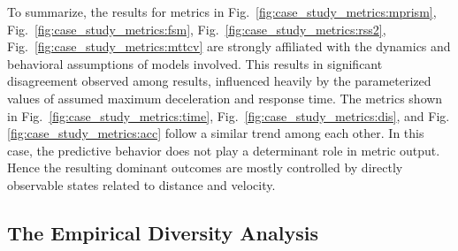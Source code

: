 \documentclass[journal]{IEEEtran}
\begin{document}
To summarize, the results for metrics in Fig.~\ref{fig:case_study_metrics:mprism}, Fig.~\ref{fig:case_study_metrics:fsm}, Fig.~\ref{fig:case_study_metrics:rss2}, Fig.~\ref{fig:case_study_metrics:mttcv} are strongly affiliated with the dynamics and behavioral assumptions of models involved. This results in significant disagreement observed among results, influenced heavily by the parameterized values of assumed maximum deceleration and response time. The metrics shown in Fig.~\ref{fig:case_study_metrics:time}, Fig.~\ref{fig:case_study_metrics:dis}, and Fig.\ref{fig:case_study_metrics:acc} follow a similar trend among each other. In this case, the predictive behavior does not play a determinant role in metric output. Hence the resulting dominant outcomes are mostly controlled by directly observable states related to distance and velocity.

\subsection{The Empirical Diversity Analysis}\label{sec:performance_da:empirical}
\end{document}
